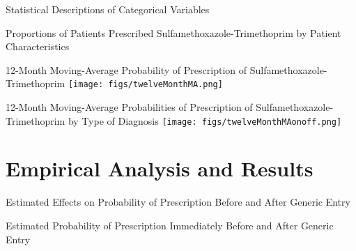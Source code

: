 \documentclass{beamer}
\begin{document}
\begin{frame}{Statistical Descriptions of Categorical Variables}
\scalebox{.65}{}
\end{frame}

\begin{frame}{Proportions of Patients Prescribed Sulfamethoxazole-Trimethoprim by Patient Characteristics}
\begin{center}
\scalebox{.45}{}
\end{center}
\end{frame}

\begin{frame}{12-Month Moving-Average Probability of Prescription of Sulfamethoxazole-Trimethoprim}
\texttt{[image: figs/twelveMonthMA.png]}
\end{frame}

\begin{frame}{12-Month Moving-Average Probabilities of Prescription of Sulfamethoxazole-Trimethoprim by Type of Diagnosis}
\texttt{[image: figs/twelveMonthMAonoff.png]}
\end{frame}


\section{Empirical Analysis and Results}
\begin{frame}{Estimated Effects on Probability of Prescription Before and After Generic Entry}
\begin{center}
\scalebox{.45}{}
\end{center}
\end{frame}

\begin{frame}{Estimated Probability of Prescription Immediately Before and After Generic Entry}
\begin{center}
\scalebox{.55}{}
\end{center}
\end{frame}
\end{document}
